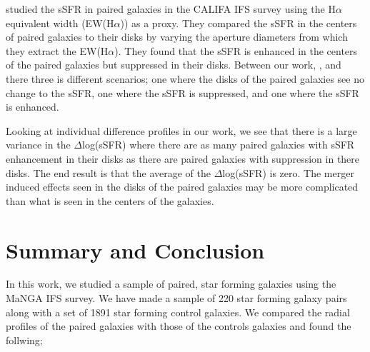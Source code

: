 \documentclass[iop,revtex4,twocolumn,apj,numberedappendix,appendixfloats]{emulateapj}
\newcommand{\ewha}{EW(H$\alpha$)}
\begin{document}
\citet{Barrera-Ballesteros:2015} studied the sSFR in paired galaxies in the CALIFA IFS survey using the H$\alpha$ equivalent width (\ewha) as a proxy. They compared the sSFR in the centers of paired galaxies to their disks by varying the aperture diameters from which they extract the \ewha. They found that the sSFR is enhanced in the centers of the paired galaxies but suppressed in their disks. Between our work, \citet{Barrera-Ballesteros:2015}, and \citet{Pan:2019} there three is different scenarios; one where the disks of the paired galaxies see no change to the sSFR, one where the sSFR is suppressed, and one where the sSFR is enhanced. 

Looking at individual difference profiles in our work, we see that there is a large variance in the $\Delta$log(sSFR) where there are as many paired galaxies with sSFR enhancement in their disks as there are paired galaxies with suppression in there disks. The end result is that the average of the $\Delta$log(sSFR) is zero. The merger induced effects seen in the disks of the paired galaxies may be more complicated than what is seen in the centers of the galaxies. 


\section{Summary and Conclusion}\label{sec:sum}

In this work, we studied a sample of paired, star forming galaxies using the MaNGA IFS survey. We have made a sample of 220 star forming galaxy pairs along with a set of 1891 star forming control galaxies. We compared the radial profiles of the paired galaxies with those of the controls galaxies and found the follwing;
\end{document}
